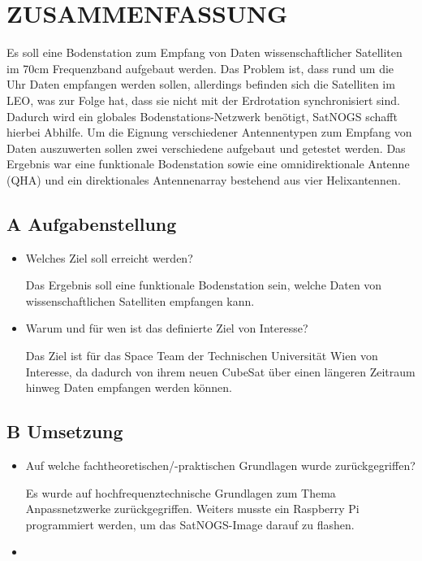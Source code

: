 \section*{ZUSAMMENFASSUNG}
Es soll eine Bodenstation zum Empfang von Daten wissenschaftlicher Satelliten im 70cm Frequenzband aufgebaut werden. Das Problem ist, dass rund um die Uhr Daten empfangen werden sollen, allerdings befinden sich die Satelliten im LEO, was zur Folge hat, dass sie nicht mit der Erdrotation synchronisiert sind. Dadurch wird ein globales Bodenstations-Netzwerk benötigt, SatNOGS schafft hierbei Abhilfe.
Um die Eignung verschiedener Antennentypen zum Empfang von Daten auszuwerten sollen zwei verschiedene aufgebaut und getestet werden.
Das Ergebnis war eine funktionale Bodenstation sowie eine omnidirektionale Antenne (QHA) und ein direktionales Antennenarray bestehend aus vier Helixantennen.

\subsection*{A Aufgabenstellung}
\begin{itemize}	
	\item Welches Ziel soll erreicht werden?
	
	Das Ergebnis soll eine funktionale Bodenstation sein, welche Daten von wissenschaftlichen Satelliten empfangen kann.
	
	\item Warum und für wen ist das definierte Ziel von Interesse?
	
	Das Ziel ist für das Space Team der Technischen Universität Wien von Interesse, da dadurch von ihrem neuen CubeSat über einen längeren Zeitraum hinweg Daten empfangen werden können.
\end{itemize}

\subsection*{B Umsetzung}
\begin{itemize}
	\item Auf welche fachtheoretischen/-praktischen Grundlagen wurde zurückgegriffen?
	
	Es wurde auf hochfrequenztechnische Grundlagen zum Thema Anpassnetzwerke zurückgegriffen. Weiters musste ein Raspberry Pi programmiert werden, um das SatNOGS-Image darauf zu flashen.
	
	\item 
\end{itemize}

